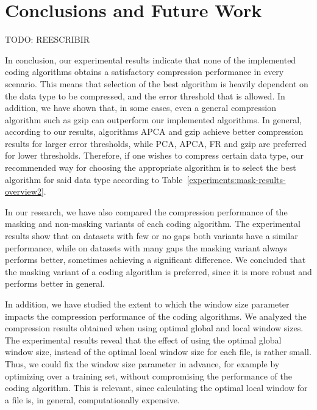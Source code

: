 
\chapter{Conclusions and Future Work} %
\label{conclusions} %



TODO: REESCRIBIR


In conclusion, our experimental results indicate that none of the implemented coding algorithms obtains a satisfactory compression performance in every scenario. This means that selection of the best algorithm is heavily dependent on the data type to be compressed, and the error threshold that is allowed. In addition, we have shown that, in some cases, even a general compression algorithm such as gzip can outperform our implemented algorithms. In general, according to our results, algorithms APCA and gzip achieve better compression results for larger error thresholds, while PCA, APCA, FR and gzip are preferred for lower thresholds. Therefore, if one wishes to compress certain data type, our recommended way for choosing the appropriate algorithm is to select the best algorithm for said data type according to Table~\ref{experiments:mask-results-overview2}.


In our research, we have also compared the compression performance of the masking and non-masking variants of each coding algorithm. The experimental results show that on datasets with few or no gaps both variants have a similar performance, while on datasets with many gaps the masking variant always performs better, sometimes achieving a significant difference. We concluded that the masking variant of a coding algorithm is preferred, since it is more robust and performs better in general.


In addition, we have studied the extent to which the window size parameter impacts the compression performance of the coding algorithms. We analyzed the compression results obtained when using optimal global and local window sizes. The experimental results reveal that the effect of using the optimal global window size, instead of the optimal local window size for each file, is rather small. Thus, we could fix the window size parameter in advance, for example by optimizing over a training set, without compromising the performance of the coding algorithm. This is relevant, since calculating the optimal local window for a file is, in general, computationally expensive.


